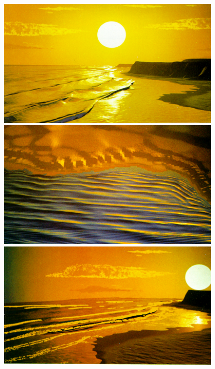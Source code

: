 \begin{figure}
 \centering
 \subtop
 {
  \includegraphics[scale=0.25]{figures/A_Simple_Model_of_Ocean_Waves_-_Fournier_1986-008.png}
 }
 \hfill
 \subtop
 {
  \includegraphics[scale=0.25]{figures/A_Simple_Model_of_Ocean_Waves_-_Fournier_1986-010.png}
 }
 \subtop
 {
  \includegraphics[scale=0.25]{figures/A_Simple_Model_of_Ocean_Waves_-_Fournier_1986-011.png}
 }
 \hfill

\end{figure}
